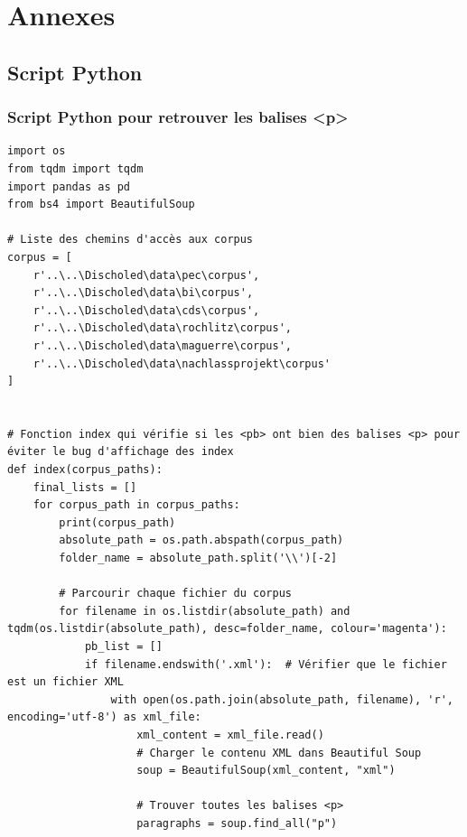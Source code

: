 \part*{Annexes}
\appendix
\renewcommand{\thechapter}{A}
\chapter{Script Python}

\section{Script Python pour retrouver les balises <p>}
\label{script_python_p}
\begin{lstlisting}[style=pythonStyle, caption=Script python pour trouver les fichiers xml avec les balises </p> manquantes]
import os
from tqdm import tqdm
import pandas as pd
from bs4 import BeautifulSoup

# Liste des chemins d'accès aux corpus
corpus = [
    r'..\..\Discholed\data\pec\corpus',
    r'..\..\Discholed\data\bi\corpus',
    r'..\..\Discholed\data\cds\corpus',
    r'..\..\Discholed\data\rochlitz\corpus',
    r'..\..\Discholed\data\maguerre\corpus',
    r'..\..\Discholed\data\nachlassprojekt\corpus'
]


# Fonction index qui vérifie si les <pb> ont bien des balises <p> pour éviter le bug d'affichage des index
def index(corpus_paths):
    final_lists = []
    for corpus_path in corpus_paths:
        print(corpus_path)
        absolute_path = os.path.abspath(corpus_path)
        folder_name = absolute_path.split('\\')[-2]

        # Parcourir chaque fichier du corpus
        for filename in os.listdir(absolute_path) and tqdm(os.listdir(absolute_path), desc=folder_name, colour='magenta'):
            pb_list = []
            if filename.endswith('.xml'):  # Vérifier que le fichier est un fichier XML
                with open(os.path.join(absolute_path, filename), 'r', encoding='utf-8') as xml_file:
                    xml_content = xml_file.read()
                    # Charger le contenu XML dans Beautiful Soup
                    soup = BeautifulSoup(xml_content, "xml")

                    # Trouver toutes les balises <p>
                    paragraphs = soup.find_all("p")


\end{lstlisting}
